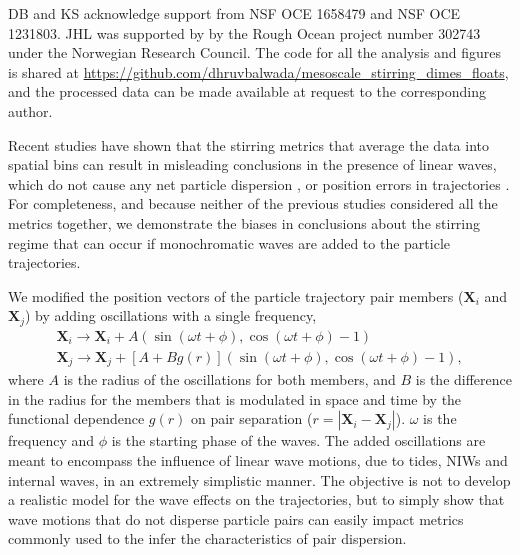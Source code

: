 \documentclass[]{ametsoc}
\begin{document}

\acknowledgments DB and KS acknowledge support from NSF OCE 1658479 and NSF OCE 1231803. JHL was supported by by the Rough Ocean project number 302743 under the Norwegian Research Council. The code for all the analysis and figures is shared at \url{https://github.com/dhruvbalwada/mesoscale_stirring_dimes_floats}, and the processed data can be made available at request to the corresponding author.

%
\appendix[A]
Recent studies have shown that the stirring metrics that average the data into spatial bins can result in misleading conclusions in the presence of linear waves, which do not cause any net particle dispersion \citep{vera2016}, or position errors in trajectories \citep{haza2014does}. For completeness, and because neither of the previous studies considered all the metrics together, we demonstrate the biases in conclusions about the stirring regime that can occur if monochromatic waves are added to the particle trajectories. 

We modified the position vectors of the particle trajectory pair members ($\mathbf{X}_i$ and $\mathbf{X}_j$) by adding oscillations with a single frequency, 
\begin{equation}
\begin{split}
    \mathbf{X}_i \rightarrow \mathbf{X}_i + A (\sin (\omega t+\phi), \cos (\omega t + \phi) -1) \\
    \mathbf{X}_j \rightarrow \mathbf{X}_j + [A + B g(r)] (\sin (\omega t+\phi), \cos (\omega t+\phi) -1),
\end{split}
\end{equation}
where $A$ is the radius of the oscillations for both members, and $B$ is the difference in the radius for the members that is modulated in space and time by the functional dependence $g(r)$ on pair separation ($r = |\mathbf{X}_i - \mathbf{X}_j|$). $\omega$ is the frequency and $\phi$ is the starting phase of the waves. The added oscillations are meant to encompass the influence of linear wave motions, due to tides, NIWs and internal waves, in an extremely simplistic manner. The objective is not to develop a realistic model for the wave effects on the trajectories, but to simply show that wave motions that do not disperse particle pairs can easily impact metrics commonly used to the infer the characteristics of pair dispersion.
\end{document}
